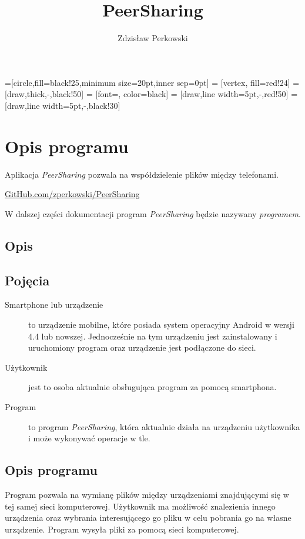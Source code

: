 \documentclass[12pt,a4paper]{article}
\author{Zdzisław Perkowski}
\title{PeerSharing}
\begin{document}
=[circle,fill=black!25,minimum size=20pt,inner sep=0pt]
 = [vertex, fill=red!24]
 = [draw,thick,-,black!50]
 = [font=\tiny, color=black]
 = [draw,line width=5pt,-,red!50]
 = [draw,line width=5pt,-,black!30]

\maketitle
\tableofcontents
\pagebreak


\section{Opis programu}

Aplikacja \textit{PeerSharing} pozwala na współdzielenie plików między telefonami.

\begin{center}
\href{https://github.com/zperkowski/PeerSharing}{GitHub.com/zperkowski/PeerSharing}
\end{center}

W dalszej części dokumentacji program \textit{PeerSharing} będzie nazywany \textit{programem}.

\subsection{Opis}

\subsection{Pojęcia}
\begin{description}
	\item[Smartphone lub urządzenie] to urządzenie mobilne, które posiada system operacyjny Android w wersji 4.4 lub nowszej. Jednocześnie na tym urządzeniu jest zainstalowany i uruchomiony program oraz urządzenie jest podłączone do sieci.
	\item[Użytkownik] jest to osoba aktualnie obsługująca program za pomocą smartphona.
	\item[Program] to program \textit{PeerSharing}, która aktualnie działa na urządzeniu użytkownika i może wykonywać operacje w tle.
\end{description}

\subsection{Opis programu}
Program pozwala na wymianę plików między urządzeniami znajdującymi się w tej samej sieci komputerowej. Użytkownik ma możliwość znalezienia innego urządzenia oraz wybrania interesującego go pliku w celu pobrania go na własne urządzenie. Program wysyła pliki za pomocą sieci komputerowej.
\end{document}
